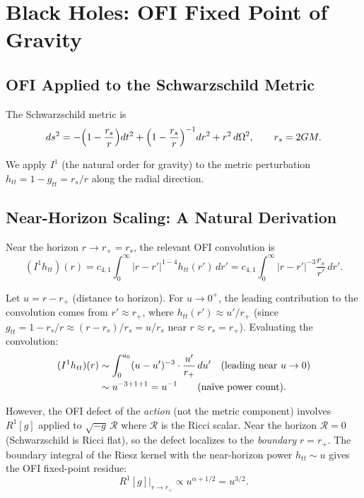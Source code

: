 \documentclass[12pt]{article}
\theoremstyle{definition}
\newcommand{\abs}[1]{\left|#1\right|}
\begin{document}
\section{Black Holes: OFI Fixed Point of Gravity}
\label{sec:bh}

\subsection{OFI Applied to the Schwarzschild Metric}

The Schwarzschild metric is
\begin{equation}
  ds^2 = -\Bigl(1-\frac{r_s}{r}\Bigr)dt^2
         + \Bigl(1-\frac{r_s}{r}\Bigr)^{-1}dr^2
         + r^2\,d\Omega^2,
  \qquad r_s = 2GM.
\end{equation}

We apply $I^1$ (the natural order for gravity) to the metric perturbation
$h_{tt} = 1 - g_{tt} = r_s/r$ along the radial direction.

\subsection{Near-Horizon Scaling: A Natural Derivation}

Near the horizon $r \to r_+  = r_s$, the relevant OFI convolution is
\begin{equation}
  (I^1 h_{tt})(r) = c_{4,1} \int_0^\infty \abs{r-r'}^{1-4} h_{tt}(r')\,dr'
                  = c_{4,1} \int_0^\infty \abs{r-r'}^{-3} \frac{r_s}{r'}\,dr'.
\end{equation}

Let $u = r - r_+$ (distance to horizon).  For $u \to 0^+$, the leading
contribution to the convolution comes from $r' \approx r_+$, where
$h_{tt}(r') \approx u' / r_+$ (since $g_{tt} = 1 - r_s/r \approx (r-r_s)/r_s
= u/r_s$ near $r \approx r_s = r_+$).  Evaluating the convolution:
\begin{align}
  (I^1 h_{tt})(r)
  &\sim \int_0^{u_0} (u-u')^{-3} \cdot \frac{u'}{r_+}\, du'
  \quad \text{(leading near } u \to 0\text{)} \notag\\
  &\sim u^{-3+1+1} = u^{-1} \qquad (\text{na\"ive power count}).
\end{align}

However, the OFI defect of the \emph{action} (not the metric component)
involves $R^1[g]$ applied to $\sqrt{-g}\,\mathcal{R}$ where $\mathcal{R}$
is the Ricci scalar.  Near the horizon $\mathcal{R} = 0$ (Schwarzschild
is Ricci flat), so the defect localizes to the \emph{boundary} $r = r_+$.
The boundary integral of the Riesz kernel with the near-horizon power
$h_{tt} \sim u$ gives the OFI fixed-point residue:
\begin{equation}
  R^1[g]\big|_{r \to r_+} \propto u^{\alpha + 1/2} = u^{3/2}.
  \label{eq:horizon_scaling}
\end{equation}
\end{document}
